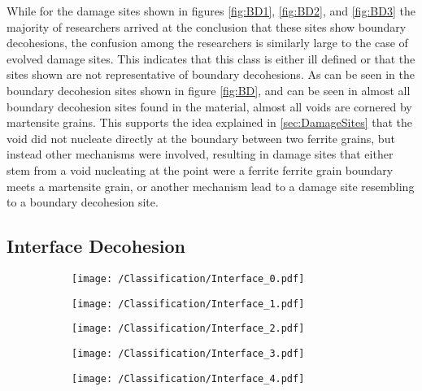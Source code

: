 While for the damage sites shown in figures \ref{fig:BD1}, \ref{fig:BD2}, and \ref{fig:BD3} the majority of researchers arrived at the conclusion that these sites show boundary decohesions, the confusion among the researchers is similarly large to the case of evolved damage sites. This indicates that this class is either ill defined or that the sites shown are not representative of boundary decohesions. As can be seen in the boundary decohesion sites shown in figure \ref{fig:BD}, and can be seen in almost all boundary decohesion sites found in the material, almost all voids are cornered by martensite grains. This supports the idea explained in \ref{sec:DamageSites} that the void did not nucleate directly at the boundary between two ferrite grains, but instead other mechanisms were involved, resulting in damage sites that either stem from a void nucleating at the point were a ferrite ferrite grain boundary meets a martensite grain, or another mechanism lead to a damage site resembling to a boundary decohesion site. 


\subsection{Interface Decohesion}


\begin{figure}[H]
\begin{subfigure}{.2\textwidth}
\centering
  \texttt{[image: /Classification/Interface\_0.pdf]}
  \caption{}
  \label{fig:ID1}
\end{subfigure}%
\begin{subfigure}{.2\textwidth}
\centering
  \texttt{[image: /Classification/Interface\_1.pdf]}
  \caption{}
  \label{fig:ID2}
\end{subfigure}%
\centering
\begin{subfigure}{.2\textwidth}
\centering
  \texttt{[image: /Classification/Interface\_2.pdf]}
  \caption{}
  \label{fig:ID3}
\end{subfigure}%
\begin{subfigure}{.2\textwidth}
\centering
  \texttt{[image: /Classification/Interface\_3.pdf]}
  \caption{}
  \label{fig:ID4}
\end{subfigure}%
\begin{subfigure}{.2\textwidth}
\centering
  \texttt{[image: /Classification/Interface\_4.pdf]}
  \caption{}
  \label{fig:ID5}
\end{subfigure}%
\caption{}
\label{fig:classes}
\end{figure}

